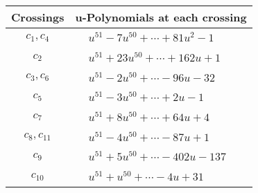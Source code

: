\documentclass[1p]{elsarticle_modified}
\theoremstyle{definition}
\begin{document}
\begin{tabular}{m{50pt}|m{274pt}}
Crossings & \hspace{64pt}u-Polynomials at each crossing \\
\hline $$\begin{aligned}c_{1},c_{4}\end{aligned}$$&$\begin{aligned}
&u^{51}-7 u^{50}+\cdots+81 u^2-1
\end{aligned}$\\
\hline $$\begin{aligned}c_{2}\end{aligned}$$&$\begin{aligned}
&u^{51}+23 u^{50}+\cdots+162 u+1
\end{aligned}$\\
\hline $$\begin{aligned}c_{3},c_{6}\end{aligned}$$&$\begin{aligned}
&u^{51}-2 u^{50}+\cdots-96 u-32
\end{aligned}$\\
\hline $$\begin{aligned}c_{5}\end{aligned}$$&$\begin{aligned}
&u^{51}-3 u^{50}+\cdots+2 u-1
\end{aligned}$\\
\hline $$\begin{aligned}c_{7}\end{aligned}$$&$\begin{aligned}
&u^{51}+8 u^{50}+\cdots+64 u+4
\end{aligned}$\\
\hline $$\begin{aligned}c_{8},c_{11}\end{aligned}$$&$\begin{aligned}
&u^{51}-4 u^{50}+\cdots-87 u+1
\end{aligned}$\\
\hline $$\begin{aligned}c_{9}\end{aligned}$$&$\begin{aligned}
&u^{51}+5 u^{50}+\cdots-402 u-137
\end{aligned}$\\
\hline $$\begin{aligned}c_{10}\end{aligned}$$&$\begin{aligned}
&u^{51}+u^{50}+\cdots-4 u+31
\end{aligned}$\\
\hline
\end{tabular}\\~\\
\end{document}
